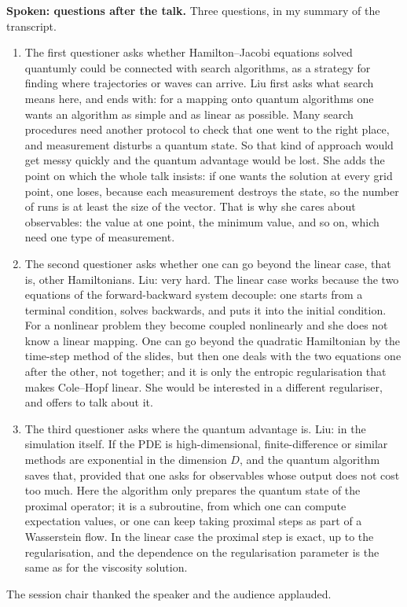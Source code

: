 \medskip\noindent
{\bf Spoken: questions after the talk.}
Three questions, in my summary of the
transcript.
\begin{enumerate}
\item The first questioner asks whether
Hamilton--Jacobi equations solved quantumly
could be connected with search
algorithms, as a strategy for finding where
trajectories or waves can arrive. Liu first
asks what search means here, and ends with: for
a mapping onto quantum algorithms one wants an
algorithm as simple and as linear as possible.
Many search procedures need another protocol
to check that one went to the right place, and
measurement disturbs a quantum state. So
that kind of approach would get messy quickly
and the quantum advantage would be lost. She
adds the point on which the whole talk
insists: if one wants the solution at every
grid point, one loses, because each measurement
destroys the state, so the number of runs is
at least the size of the vector. That is why she
cares about observables: the value at one
point, the minimum value, and so on, which
need one type of measurement.

\item The second questioner asks whether one
can go beyond the linear case, that is, other
Hamiltonians. Liu: very hard. The linear case
works because the two equations of the
forward-backward system decouple: one starts
from a terminal condition, solves backwards,
and puts it into the initial condition. For a
nonlinear problem they become coupled
nonlinearly and she does not know a linear
mapping. One can go beyond the quadratic
Hamiltonian by the time-step method of the
slides, but then one deals with the two
equations one after the other, not together;
and it is only the entropic regularisation
that makes Cole--Hopf linear. She would be
interested in a different regulariser, and
offers to talk about it.

\item The third questioner asks where the
quantum advantage is. Liu: in the simulation
itself. If the PDE is high-dimensional,
finite-difference or similar methods are
exponential in the dimension $D$, and the
quantum algorithm saves that, provided that one
asks for observables whose output does not
cost too much. Here the algorithm only
prepares the quantum state of the proximal
operator; it is a subroutine, from which one
can compute expectation values, or one can
keep taking proximal steps as part of a
Wasserstein flow. In the linear case the
proximal step is exact, up to the
regularisation, and the dependence on the
regularisation parameter is the same as for
the viscosity solution.
\end{enumerate}
The session chair thanked the speaker and the
audience applauded.

